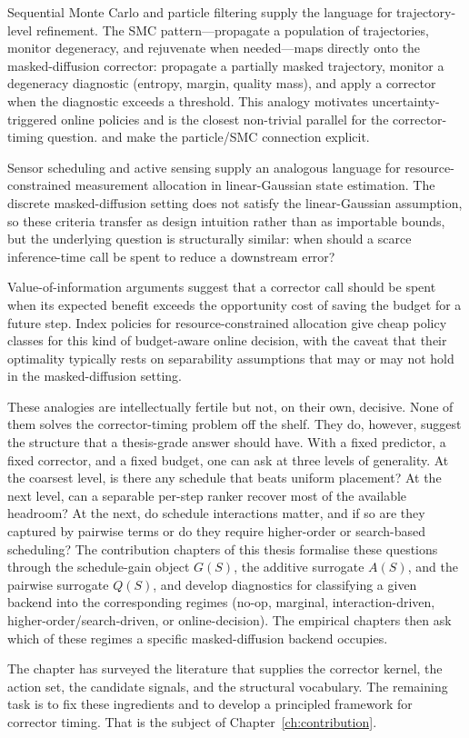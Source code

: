 Sequential Monte Carlo and particle filtering supply the language for
trajectory-level refinement. The SMC pattern---propagate a population of
trajectories, monitor degeneracy, and rejuvenate when needed---maps
directly onto the masked-diffusion corrector: propagate a partially masked
trajectory, monitor a degeneracy diagnostic (entropy, margin, quality
mass), and apply a corrector when the diagnostic exceeds a threshold.
This analogy motivates uncertainty-triggered online policies and is the
closest non-trivial parallel for the corrector-timing question.
\textcite{hasan2026fkc} and \textcite{dang2025particlegibbs} make the
particle/SMC connection explicit.

Sensor scheduling and active sensing supply an analogous language for
resource-constrained measurement allocation in linear-Gaussian state
estimation. The discrete masked-diffusion setting does not satisfy the
linear-Gaussian assumption, so these criteria transfer as design
intuition rather than as importable bounds, but the underlying question
is structurally similar: when should a scarce inference-time call be
spent to reduce a downstream error?

Value-of-information arguments suggest that a corrector call should be
spent when its expected benefit exceeds the opportunity cost of saving
the budget for a future step. Index policies for resource-constrained
allocation give cheap policy classes for this kind of budget-aware
online decision, with the caveat that their optimality typically rests
on separability assumptions that may or may not hold in the
masked-diffusion setting.

These analogies are intellectually fertile but not, on their own,
decisive. None of them solves the corrector-timing problem off the shelf.
They do, however, suggest the structure that a thesis-grade answer should
have. With a fixed predictor, a fixed corrector, and a fixed budget, one
can ask at three levels of generality. At the coarsest level, is there any
schedule that beats uniform placement? At the next level, can a separable
per-step ranker recover most of the available headroom? At the next, do
schedule interactions matter, and if so are they captured by pairwise
terms or do they require higher-order or search-based scheduling? The
contribution chapters of this thesis formalise these questions through
the schedule-gain object $G(S)$, the additive surrogate $A(S)$, and the
pairwise surrogate $Q(S)$, and develop diagnostics for classifying a
given backend into the corresponding regimes (no-op, marginal,
interaction-driven, higher-order/search-driven, or online-decision). The
empirical chapters then ask which of these regimes a specific
masked-diffusion backend occupies.

The chapter has surveyed the literature that supplies the corrector
kernel, the action set, the candidate signals, and the structural
vocabulary. The remaining task is to fix these ingredients and to develop
a principled framework for corrector timing. That is the subject of
Chapter~\ref{ch:contribution}.

